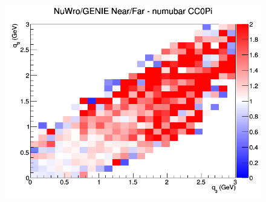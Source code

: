 \begin{figure}[h]
\endminipage
{}
\includegraphics[width=\linewidth]{eff_q0_q3/LAr/ratios/CC0Pi_NuWro_GENIE_numubar_NF_q3_q0.png}
\endminipage
\newline
\end{figure}
\clearpage
